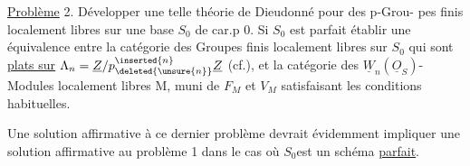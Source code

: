\uline{Problème} 2. Développer une telle théorie de Dieudonné pour des p-Grou-\linebreak
pes finis localement libres sur une base $S_0$ de car.p 0. Si $S_0$ est parfait
établir une équivalence entre la catégorie des Groupes finis localement libres sur $S_0$ qui sont \uline{plats sur} $\Lambda_n=\underline Z/p_{\deleted{\unsure{n}}}^{\inserted{n}}\underline Z$ (cf.\qquad), et la catégorie des $\underline W_n(\underline O_S)$-Modules localement libres M, muni de $F_M$ et $V_M$  satisfaisant les conditions habituelles.

Une solution affirmative à ce dernier problème devrait évidemment impliquer une solution affirmative au problème 1 dans le cas où $S_0$est un schéma \uline{parfait}.
